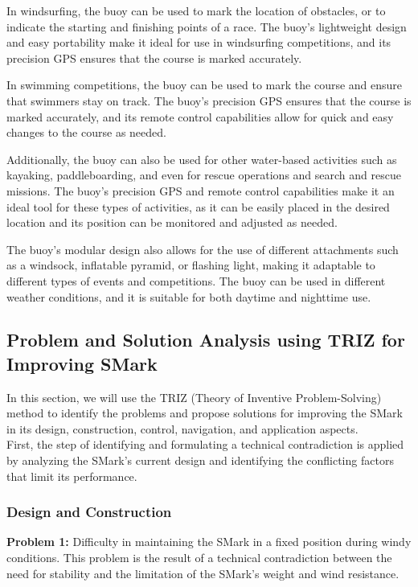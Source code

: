 \documentclass[12pt, twoside]{report}
\begin{document}
In windsurfing, the buoy can be used to mark the location of obstacles, or to indicate the starting and finishing points of a race. The buoy's lightweight design and easy portability make it ideal for use in windsurfing competitions, and its precision GPS ensures that the course is marked accurately.

In swimming competitions, the buoy can be used to mark the course and ensure that swimmers stay on track. The buoy's precision GPS ensures that the course is marked accurately, and its remote control capabilities allow for quick and easy changes to the course as needed.

Additionally, the buoy can also be used for other water-based activities such as kayaking, paddleboarding, and even for rescue operations and search and rescue missions. The buoy's precision GPS and remote control capabilities make it an ideal tool for these types of activities, as it can be easily placed in the desired location and its position can be monitored and adjusted as needed.

The buoy's modular design also allows for the use of different attachments such as a windsock, inflatable pyramid, or flashing light, making it adaptable to different types of events and competitions. The buoy can be used in different weather conditions, and it is suitable for both daytime and nighttime use.

\subsection{Problem and Solution Analysis using TRIZ for Improving SMark}

In this section, we will use the TRIZ (Theory of Inventive Problem-Solving) method to identify the problems and propose solutions for improving the SMark in its design, construction, control, navigation, and application aspects.\\
First, the step of identifying and formulating a technical contradiction is applied by analyzing the SMark's current design and identifying the conflicting factors that limit its performance.

\subsubsection{Design and Construction}

\textbf{Problem 1:} Difficulty in maintaining the SMark in a fixed position during windy conditions.
This problem is the result of a technical contradiction between the need for stability and the limitation of the SMark's weight and wind resistance.
\end{document}
